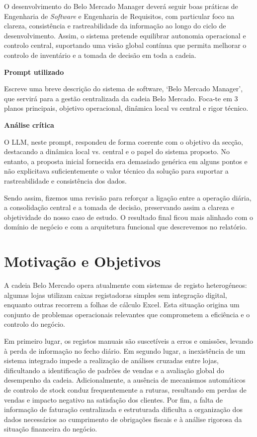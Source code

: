     O desenvolvimento do Belo Mercado Manager deverá seguir boas práticas de Engenharia de \textit{Software} e Engenharia de Requisitos, com particular foco na clareza, consistência e rastreabilidade da informação ao longo do ciclo de desenvolvimento. Assim, o sistema pretende equilibrar autonomia operacional e controlo central, suportando uma visão global contínua que permita melhorar o controlo de inventário e a tomada de decisão em toda a cadeia.

    \begin{tcolorbox}[title=Interação com o LLM]
    \textbf{Prompt utilizado}

    Escreve uma breve descrição do sistema de software, `Belo Mercado Manager', que servirá para a gestão centralizada da cadeia Belo Mercado. Foca-te em 3 planos principais, objetivo operacional, dinâmica local vs central e rigor técnico.

    \tcblower

    \textbf{Análise crítica}

    O LLM, neste prompt, respondeu de forma coerente com o objetivo da secção, destacando a dinâmica local vs.
    central e o papel do sistema proposto. No entanto, a proposta inicial fornecida era demasiado genérica em alguns pontos e não explicitava suficientemente o valor técnico da solução para suportar a rastreabilidade e consistência dos dados.

    Sendo assim, fizemos uma revisão para reforçar a ligação entre a operação diária, a consolidação central e a tomada de decisão, preservando assim a clareza e objetividade do nosso caso de estudo. O resultado final ficou mais alinhado com o domínio de negócio e com a arquitetura funcional que descrevemos no relatório.
    \end{tcolorbox}

\section{Motivação e Objetivos}
    A cadeia Belo Mercado opera atualmente com sistemas de registo heterogéneos: algumas lojas utilizam caixas registadoras simples sem integração digital, enquanto outras recorrem a folhas de cálculo Excel. Esta situação origina um conjunto de problemas operacionais relevantes que comprometem a eficiência e o controlo do negócio.

    Em primeiro lugar, os registos manuais são suscetíveis a erros e omissões, levando à perda de informação no fecho diário. Em segundo lugar, a inexistência de um sistema integrado impede a realização de análises cruzadas entre lojas, dificultando a identificação de padrões de vendas e a avaliação global do desempenho da cadeia. Adicionalmente, a ausência de mecanismos automáticos de controlo de stock conduz frequentemente a ruturas, resultando em perdas de vendas e impacto negativo na satisfação dos clientes. Por fim, a falta de informação de faturação centralizada e estruturada dificulta a organização dos dados necessários ao cumprimento de obrigações fiscais e à análise rigorosa da situação financeira do negócio.
    
